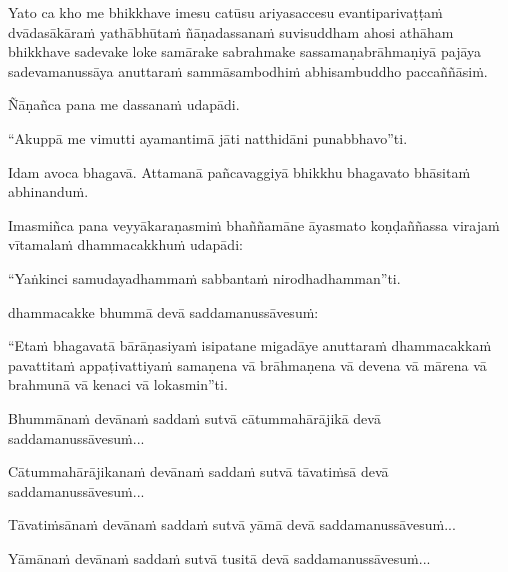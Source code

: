 \begin{pali-hang}
Yato ca kho me bhikkhave imesu catūsu ariyasaccesu evantiparivaṭṭaṁ dvādasākāraṁ yathābhūtaṁ ñāṇadassanaṁ suvisuddham ahosi athāham bhikkhave sadevake loke samārake sabrahmake sassamaṇabrāhmaṇiyā pajāya sadevamanussāya anuttaraṁ sammāsambodhiṁ abhisambuddho paccaññāsiṁ.
\end{pali-hang}


Ñāṇañca pana me dassanaṁ udapādi.


\begin{pali-hang}
``Akuppā me vimutti ayamantimā jāti natthidāni punabbhavo''ti.
\end{pali-hang}

\begin{pali-hang}
Idam avoca bhagavā. Attamanā pañcavaggiyā bhikkhu bhagavato bhāsitaṁ abhinanduṁ.
\end{pali-hang}

\begin{pali-hang}
Imasmiñca pana veyyākaraṇasmiṁ bhaññamāne āyasmato koṇḍaññassa virajaṁ vītamalaṁ dhammacakkhuṁ udapādi:
\end{pali-hang}

``Yaṅkinci samudayadhammaṁ sabbantaṁ nirodhadhamman''ti.

\begin{pali-hang}
 dhammacakke bhummā devā saddamanussāvesuṁ:
\end{pali-hang}

\begin{pali-hang}
``Etaṁ bhagavatā bārāṇasiyaṁ isipatane migadāye anuttaraṁ dhammacakkaṁ pavattitaṁ appaṭivattiyaṁ samaṇena vā brāhmaṇena vā devena vā mārena vā brahmunā vā kenaci vā lokasmin''ti.
\end{pali-hang}

\begin{pali-hang}
Bhummānaṁ devānaṁ saddaṁ sutvā cātummahārājikā devā saddamanussāvesuṁ...
\end{pali-hang}

\begin{pali-hang}
Cātummahārājikanaṁ devānaṁ saddaṁ sutvā tāvatiṁsā devā saddamanussāvesuṁ...
\end{pali-hang}

\begin{pali-hang}
Tāvatiṁsānaṁ devānaṁ saddaṁ sutvā yāmā devā saddamanussāvesuṁ...
\end{pali-hang}

\begin{pali-hang}
Yāmānaṁ devānaṁ saddaṁ sutvā tusitā devā saddamanussāvesuṁ...
\end{pali-hang}

